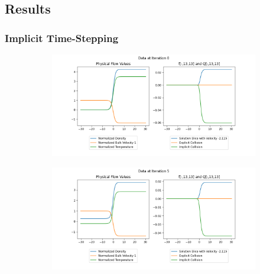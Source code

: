 \documentclass{article}
\begin{document}
\subsection{Results}
\subsubsection{Implicit Time-Stepping}
\begin{figure}[H]
  \centering
  \begin{subfigure}[b]{\textwidth}
  \includegraphics[width=\textwidth]{imgs/time_step/output_implicit/0.png}
      \label{fig:image1}
  \end{subfigure}
  \hfill
  \begin{subfigure}[b]{\textwidth}
  \includegraphics[width=\textwidth]{imgs/time_step/output_implicit/5.png}
      \label{fig:image2}
  \end{subfigure}
\end{figure}
  
\end{document}
